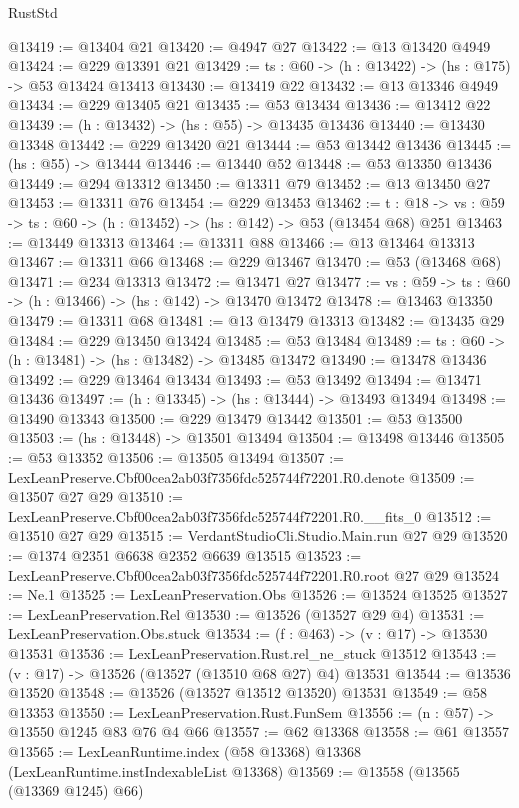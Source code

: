 \begin{lexlean}{RustStd}
\begin{coremodule}
@13419 := @13404 @21
@13420 := @4947 @27
@13422 := @13 @13420 @4949
@13424 := @229 @13391 @21
@13429 := {ts : @60} -> (h : @13422) -> (hs : @175) -> @53 @13424 @13413
@13430 := @13419 @22
@13432 := @13 @13346 @4949
@13434 := @229 @13405 @21
@13435 := @53 @13434
@13436 := @13412 @22
@13439 := (h : @13432) -> (hs : @55) -> @13435 @13436
@13440 := @13430 @13348
@13442 := @229 @13420 @21
@13444 := @53 @13442 @13436
@13445 := (hs : @55) -> @13444
@13446 := @13440 @52
@13448 := @53 @13350 @13436
@13449 := @294 @13312
@13450 := @13311 @79
@13452 := @13 @13450 @27
@13453 := @13311 @76
@13454 := @229 @13453
@13462 := {t : @18} ->
  {vs : @59} -> {ts : @60} -> (h : @13452) -> (hs : @142) -> @53 (@13454 @68) @251
@13463 := @13449 @13313
@13464 := @13311 @88
@13466 := @13 @13464 @13313
@13467 := @13311 @66
@13468 := @229 @13467
@13470 := @53 (@13468 @68)
@13471 := @234 @13313
@13472 := @13471 @27
@13477 := {vs : @59} -> {ts : @60} -> (h : @13466) -> (hs : @142) -> @13470 @13472
@13478 := @13463 @13350
@13479 := @13311 @68
@13481 := @13 @13479 @13313
@13482 := @13435 @29
@13484 := @229 @13450 @13424
@13485 := @53 @13484
@13489 := {ts : @60} -> (h : @13481) -> (hs : @13482) -> @13485 @13472
@13490 := @13478 @13436
@13492 := @229 @13464 @13434
@13493 := @53 @13492
@13494 := @13471 @13436
@13497 := (h : @13345) -> (hs : @13444) -> @13493 @13494
@13498 := @13490 @13343
@13500 := @229 @13479 @13442
@13501 := @53 @13500
@13503 := (hs : @13448) -> @13501 @13494
@13504 := @13498 @13446
@13505 := @53 @13352
@13506 := @13505 @13494
@13507 := LexLeanPreserve.Cbf00cea2ab03f7356fdc525744f72201.R0.denote
@13509 := @13507 @27 @29
@13510 := LexLeanPreserve.Cbf00cea2ab03f7356fdc525744f72201.R0.__fits_0
@13512 := @13510 @27 @29
@13515 := VerdantStudioCli.Studio.Main.run @27 @29
@13520 := @1374 @2351 @6638 @2352 @6639 @13515
@13523 := LexLeanPreserve.Cbf00cea2ab03f7356fdc525744f72201.R0.root @27 @29
@13524 := Ne.{1}
@13525 := LexLeanPreservation.Obs
@13526 := @13524 @13525
@13527 := LexLeanPreservation.Rel
@13530 := @13526 (@13527 @29 @4)
@13531 := LexLeanPreservation.Obs.stuck
@13534 := (f : @463) -> (v : @17) -> @13530 @13531
@13536 := LexLeanPreservation.Rust.rel_ne_stuck @13512
@13543 := (v : @17) -> @13526 (@13527 (@13510 @68 @27) @4) @13531
@13544 := @13536 @13520
@13548 := @13526 (@13527 @13512 @13520) @13531
@13549 := @58 @13353
@13550 := LexLeanPreservation.Rust.FunSem
@13556 := (n : @57) -> @13550 @1245 @83 @76 @4 @66
@13557 := @62 @13368
@13558 := @61 @13557
@13565 := LexLeanRuntime.index (@58 @13368) @13368 (LexLeanRuntime.instIndexableList @13368)
@13569 := @13558 (@13565 (@13369 @1245) @66)

\end{coremodule}
\end{lexlean}
